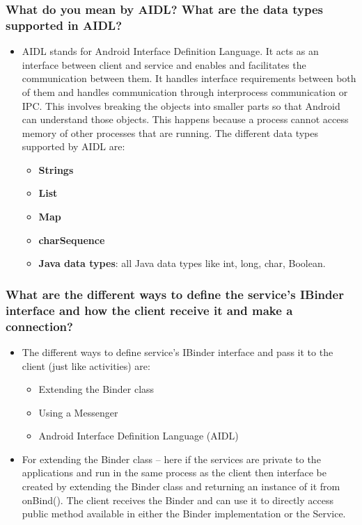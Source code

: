 \documentclass[9pt, b5paper]{article}
\begin{document}
\subsubsection{What do you mean by AIDL? What are the data types supported in AIDL?}
\label{sec-1-4-5}
\begin{itemize}
\item AIDL stands for Android Interface Definition Language. It acts as an interface between client and service and enables and facilitates the communication between them. It handles interface requirements between both of them and handles communication through interprocess communication or IPC. This involves breaking the objects into smaller parts so that Android can understand those objects. This happens because a process cannot access memory of other processes that are running. The different data types supported by AIDL are:
\begin{itemize}
\item \textbf{Strings}
\item \textbf{List}
\item \textbf{Map}
\item \textbf{charSequence}
\item \textbf{Java data types}: all Java data types like int, long, char, Boolean.
\end{itemize}
\end{itemize}
\subsubsection{What are the different ways to define the service's IBinder interface and how the client receive it and make a connection?}
\label{sec-1-4-6}
\begin{itemize}
\item The different ways to define service's IBinder interface and pass it to the client (just like activities) are:
\begin{itemize}
\item Extending the Binder class
\item Using a Messenger
\item Android Interface Definition Language (AIDL)
\end{itemize}
\item For extending the Binder class – here if the services are private to the applications and run in the same process as the client then interface be created by extending the Binder class and returning an instance of it from onBind(). The client receives the Binder and can use it to directly access public method available in either the Binder implementation or the Service.
\end{itemize}
\end{document}
